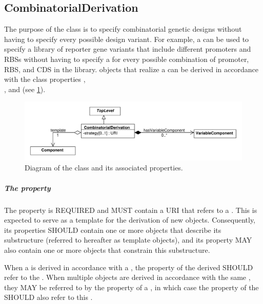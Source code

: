 \subsection{CombinatorialDerivation}
\label{sec:CombinatorialDerivation}

The purpose of the  class is to specify combinatorial genetic designs without having to specify every possible design variant. For example, a  can be used to specify a library of reporter gene variants that include different promoters and RBSs without having to specify a  for every possible combination of promoter, RBS, and CDS in the library.  objects that realize a  can be derived in accordance with the class properties , \\
, and  (see \ref{uml:combinatorial_derivation}).

\begin{figure}[ht]
\begin{center}
\includegraphics[scale=0.6]{uml/combinatorial_derivation}
\caption[]{Diagram of the  class and its associated properties.}
\label{uml:combinatorial_derivation}
\end{center}
\end{figure}

\subparagraph{The  property}\label{sec:template}

The  property is REQUIRED and MUST contain a URI that refers to a . 
This  is expected to serve as a template for the derivation of new  objects. 
Consequently, its  properties SHOULD contain one or more  objects that describe its substructure (referred to hereafter as template  objects), and its  property MAY also contain one or more  objects that constrain this substructure.

When a  is derived in accordance with a , the  property of the derived  SHOULD refer to the . When multiple  objects are derived in accordance with the same , they MAY be referred to by the  property of a , in which case the  property of the  SHOULD also refer to this .

